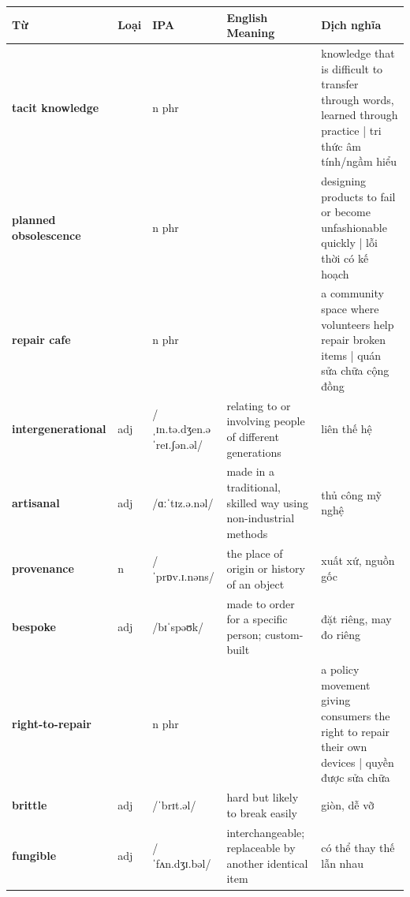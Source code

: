 \vspace{0.8em}
\begin{center}
\renewcommand{\arraystretch}{1.65}
\begin{tabularx}{\textwidth}{|V{0.22\textwidth}|C{0.07\textwidth}|I{0.20\textwidth}|Y|V{0.18\textwidth}|}
\hline
{}
\textbf{Từ} & \textbf{Loại} & \textbf{IPA} & \textbf{English Meaning} & \textbf{Dịch nghĩa} \\
\hline
\textbf{tacit knowledge} & & n phr & & knowledge that is difficult to transfer through words, learned through practice | tri thức âm tính/ngầm hiểu \\ \hline
\textbf{planned obsolescence} & & n phr & & designing products to fail or become unfashionable quickly | lỗi thời có kế hoạch \\ \hline
\textbf{repair cafe} & & n phr & & a community space where volunteers help repair broken items | quán sửa chữa cộng đồng \\ \hline
\textbf{intergenerational} & adj & /ˌɪn.tə.dʒen.əˈreɪ.ʃən.əl/ & relating to or involving people of different generations & liên thế hệ \\ \hline
\textbf{artisanal} & adj & /ɑːˈtɪz.ə.nəl/ & made in a traditional, skilled way using non-industrial methods & thủ công mỹ nghệ \\ \hline
\textbf{provenance} & n & /ˈprɒv.ɪ.nəns/ & the place of origin or history of an object & xuất xứ, nguồn gốc \\ \hline
\textbf{bespoke} & adj & /bɪˈspəʊk/ & made to order for a specific person; custom-built & đặt riêng, may đo riêng \\ \hline
\textbf{right-to-repair} & & n phr & & a policy movement giving consumers the right to repair their own devices | quyền được sửa chữa \\ \hline
\textbf{brittle} & adj & /ˈbrɪt.əl/ & hard but likely to break easily & giòn, dễ vỡ \\ \hline
\textbf{fungible} & adj & /ˈfʌn.dʒɪ.bəl/ & interchangeable; replaceable by another identical item & có thể thay thế lẫn nhau \\ \hline
\end{tabularx}
\end{center}

\newpage

